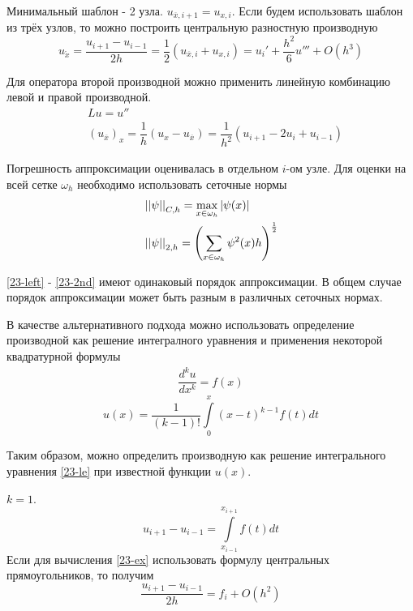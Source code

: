 Минимальный шаблон - 2 узла. $u_{\overline{x}, i + 1} = u_{x, i}$. Если будем
использовать шаблон из трёх узлов, то можно построить центральную разностную
производную
\begin{equation}
  \label{23-center}
  u_{\mathring{x}} = \dfrac{u_{i + 1} - u_{i - 1}}{2h} = \dfrac{1}{2}
  (u_{\overline{x}, i} + u_{x, i}) = u_i' + \dfrac{h^2}{6}u''' + O(h^3)
\end{equation}

Для оператора второй производной можно применить линейную комбинацию левой и правой
производной.
\begin{align}
  \label{23-2nd}
  &\nonumber Lu = u''\\
  &(u_{\overline{x}})_x = \dfrac{1}{h}(u_x - u_{\overline{x}}) = \dfrac{1}{h^2}
  (u_{i + 1} - 2u_i + u_{i - 1})
\end{align}

Погрешность аппроксимации оценивалась в отдельном $i$-ом узле. Для оценки на всей
сетке $\omega_h$ необходимо использовать сеточные нормы
\begin{equation}
  \begin{split}
    &\left\lvert \left\lvert \psi \right\rvert \right\rvert_{C,h} = \underset{x \in \omega_h}\max\left\lvert \psi(x) \right\rvert\\
    &\left\lvert \left\lvert \psi \right\rvert \right\rvert_{2, h} = \left(\sum\limits_{x \in \omega_h}
    \psi^2(x)h\right)^{\frac{1}{2}}
  \end{split}
\end{equation}

\eqref{23-left} - \eqref{23-2nd} имеют одинаковый порядок аппроксимации. В общем
случае порядок аппроксимации может быть разным в различных сеточных нормах.

В качестве альтернативного подхода можно использовать определение производной как
решение интегралного уравнения и применения некоторой квадратурной формулы
\begin{align*}
  \dfrac{d^ku}{dx^k} = f(x)
\end{align*}
\begin{equation}
  \label{23-le}
  u(x) = \dfrac{1}{(k - 1)!}\int\limits_0^x(x - t)^{k - 1}f(t)dt
\end{equation}

Таким образом, можно определить производную как решение интегрального уравнения
\eqref{23-le} при известной функции $u(x)$.

\begin{example}
  $k = 1$.
  \begin{equation}
    \label{23-ex}
    u_{i + 1} - u_{i - 1} = \int\limits_{x_{i - 1}}^{x_{i + 1}}f(t)dt
  \end{equation}
  Если для вычисления \eqref{23-ex} использовать формулу центральных
  прямоугольников, то получим
  \begin{equation}
    \dfrac{u_{i + 1} - u_{i - 1}}{2h} = f_i + O(h^2)
  \end{equation}
\end{example}

